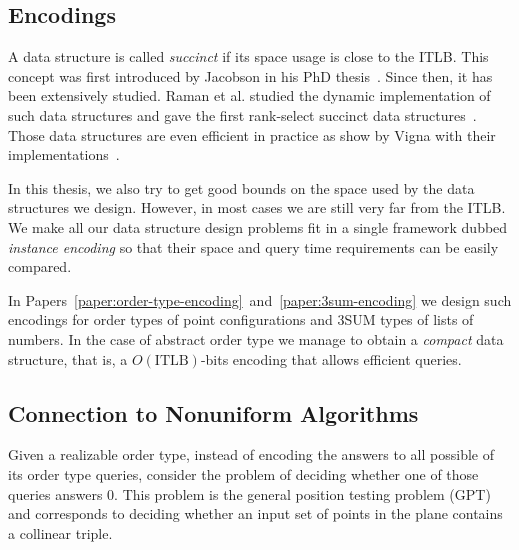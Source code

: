 \subsection{Encodings}%
\label{sec:models-of-computation:data-structures:encodings}

A data structure is called \emph{succinct} if its space usage is close to the ITLB.
%
This concept was first introduced by Jacobson in his PhD thesis~\cite{Ja88}.
%
Since then, it has been extensively studied.
%
Raman et al. studied the dynamic implementation of such data
structures and gave the first rank-select succinct
data structures~\cite{RRS01,RRS07}.
%
%
Those data structures are even efficient in practice as show by Vigna with
their implementations~\cite{Vi08}.

In this thesis, we also try to get good bounds on the space used by the data
structures we design. However, in most cases we are still very far from the
ITLB. We make all our data structure design problems fit in a single framework
dubbed \emph{instance encoding} so that their space and query time
requirements can be easily compared.




In Papers~\ref{paper:order-type-encoding}~and~\ref{paper:3sum-encoding} we
design such encodings for order types of point configurations and 3SUM types of
lists of numbers. In the case of abstract order type we manage to
obtain a \emph{compact} data structure, that is, a \(O(\text{ITLB})\)-bits encoding
that allows efficient queries.

\subsection{Connection to Nonuniform Algorithms}%
\label{sec:models-of-computation:data-structures:trees}



Given a realizable order type, instead of encoding the answers to all possible
of its order type queries, consider the problem of deciding whether one of
those queries answers \(0\).
This problem is the general position testing problem (GPT) and corresponds to
deciding whether an input set of points in the plane contains a collinear
triple.

